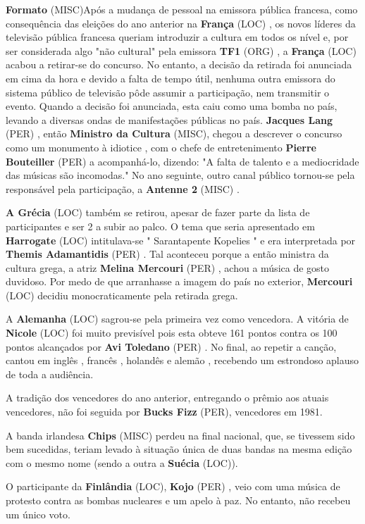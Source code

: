 \documentclass[12pt,a4paper]{article}
\begin{document}
\textbf{Formato} (MISC)Após a mudança de pessoal na emissora pública francesa, como consequência das eleições do ano anterior na \textbf{França} (LOC) , os novos líderes da televisão pública francesa queriam introduzir a cultura em todos os nível e, por ser considerada algo "não cultural" pela emissora \textbf{TF1} (ORG) , a \textbf{França} (LOC) acabou a retirar-se do concurso. No entanto, a decisão da retirada foi anunciada em cima da hora e devido a falta de tempo útil, nenhuma outra emissora do sistema público de televisão pôde assumir a participação, nem transmitir o evento. Quando a decisão foi anunciada, esta caiu como uma bomba no país, levando a diversas ondas de manifestações públicas no país. \textbf{Jacques Lang} (PER) , então \textbf{Ministro da Cultura} (MISC), chegou a descrever o concurso como um monumento à idiotice , com o chefe de entretenimento \textbf{Pierre Bouteiller} (PER) a acompanhá-lo, dizendo: "A falta de talento e a mediocridade das músicas são incomodas." No ano seguinte, outro canal público tornou-se pela responsável pela participação, a \textbf{Antenne 2} (MISC) .

\textbf{A Grécia} (LOC) também se retirou, apesar de fazer parte da lista de participantes e ser 2 a subir ao palco. O tema que seria apresentado em \textbf{Harrogate} (LOC) intitulava-se " Sarantapente Kopelies " e era interpretada por \textbf{Themis Adamantidis} (PER) . Tal aconteceu porque a então ministra da cultura grega, a atriz \textbf{Melina Mercouri} (PER) , achou a música de gosto duvidoso. Por medo de que arranhasse a imagem do país no exterior, \textbf{Mercouri} (LOC) decidiu monocraticamente pela retirada grega.

A \textbf{Alemanha} (LOC) sagrou-se pela primeira vez como vencedora. A vitória de \textbf{Nicole} (LOC) foi muito previsível pois esta obteve 161 pontos contra os 100 pontos alcançados por \textbf{Avi Toledano} (PER) . No final, ao repetir a canção, cantou em inglês , francês , holandês e alemão , recebendo um estrondoso aplauso de toda a audiência.

A tradição dos vencedores do ano anterior, entregando o prêmio aos atuais vencedores, não foi seguida por \textbf{Bucks Fizz} (PER), vencedores em 1981.

A banda irlandesa \textbf{Chips} (MISC) perdeu na final nacional, que, se tivessem sido bem sucedidas, teriam levado à situação única de duas bandas na mesma edição com o mesmo nome (sendo a outra a \textbf{Suécia} (LOC)).

O participante da \textbf{Finlândia} (LOC), \textbf{Kojo} (PER) , veio com uma música de protesto contra as bombas nucleares e um apelo à paz. No entanto, não recebeu um único voto.
\end{document}
